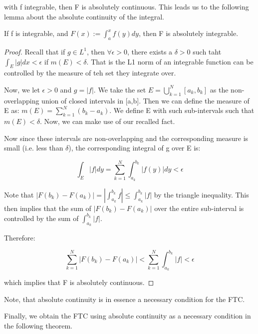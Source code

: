 \documentclass[class=article, crop=false]{standalone}
\begin{document}
			with f integrable, then F is absolutely continuous. This leads us to the following lemma about the absolute continuity of the integral.

			\begin{lemma} 

				If f is integrable, and $F(x) := \int_a^x f(y) dy$, then F is absolutely integrable.
			\end{lemma}
			\begin{proof}
				Recall that if $g \in L^1$, then $\forall \epsilon > 0$, there exists a $\delta > 0$ such taht $\int_E |g| dx < \epsilon$ if $m(E) < \delta$. That is the L1 norm of an integrable function can be controlled by the measure of teh set they integrate over.

				Now, we let $\epsilon > 0$ and $g = |f|$. We take the set $E = \bigcup_{k=1}^N [a_k, b_k]$ as the non-overlapping union of closed intervals in [a,b]. Then we can define the measure of E as: $m(E) = \sum_{k=1}^N (b_k - a_k)$. We define E with such sub-intervals such that $m(E) < \delta$. Now, we can make use of our recalled fact. 

				Now since these intervals are non-overlapping and the corresponding measure is small (i.e. less than $\delta$), the corresponding integral of g over E is:

					$$\int_E |f| dy = \sum_{k=1}^N \int_{a_k}^{b_k} |f(y)| dy < \epsilon$$

				Note that $|F(b_k) - F(a_k)| = |\int_{a_k}^{b_k} f| \le \int_{a_k}^{b_k} |f|$ by the triangle inequality. This then implies that the sum of $|F(b_k) - F(a_k)|$ over the entire sub-interval is controlled by the sum of $\int_{a_k}^{b_k} |f|$.

				Therefore:

					$$\sum_{k=1}^N |F(b_k) - F(a_k)| < \sum_{k=1}^N \int_{a_k}^{b_k} |f| < \epsilon$$

				which implies that F is absolutely continuous.
			\end{proof}

			Note, that absolute continuity is in essence a necessary condition for the FTC.

			Finally, we obtain the FTC using absolute continuity as a necessary condition in the following theorem.
\end{document}
